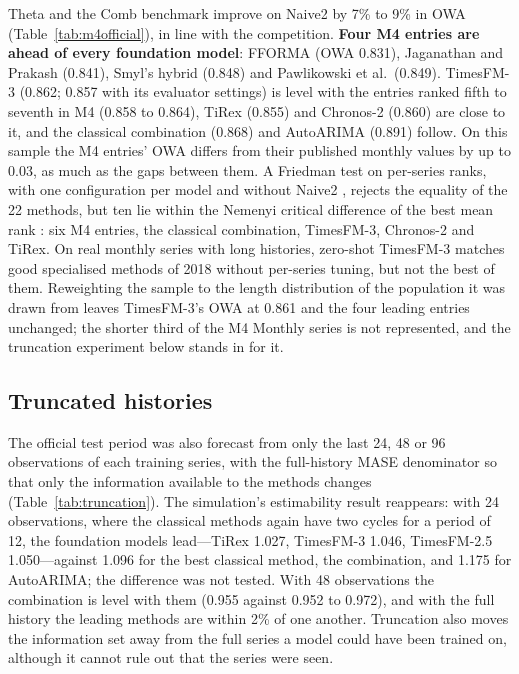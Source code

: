 \documentclass[ASNA]{USG}
\providecommand{\tableref}[1]{Table~\ref{#1}}
\begin{document}


Theta and the Comb benchmark improve on Naive2 by 7\% to 9\% in OWA (\tableref{tab:m4official}), in line
with the competition. \textbf{Four M4 entries are ahead of every foundation model}: FFORMA (OWA 0.831),
Jaganathan and Prakash (0.841), Smyl's hybrid (0.848) and Pawlikowski et al.\ (0.849). TimesFM-3 (0.862;
0.857 with its evaluator settings) is level with the entries ranked fifth to seventh in M4 (0.858 to 0.864),
TiRex (0.855) and Chronos-2 (0.860) are close to it, and the classical combination (0.868) and AutoARIMA
(0.891) follow. On this sample the M4 entries' OWA differs from their published monthly values by up to
0.03, as much as the gaps between them. A Friedman test on per-series ranks, with one configuration per model
and without Naive2 \citep{benavoli2016should}, rejects the equality of the 22 methods, but ten lie within the
Nemenyi critical difference of the best mean rank \citep{demsar2006statistical}: six M4 entries, the
classical combination, TimesFM-3, Chronos-2 and TiRex. On real monthly series with long histories, zero-shot
TimesFM-3 matches good specialised methods of 2018 without per-series tuning, but not the best of them.
Reweighting the sample to the length distribution of the population it was drawn from leaves TimesFM-3's
OWA at 0.861 and the four leading entries unchanged; the shorter third of the M4 Monthly series is not
represented, and the truncation experiment below stands in for it.

\subsection{Truncated histories}
\label{sec:truncation}

The official test period was also forecast from only the last 24, 48 or 96 observations of each training
series, with the full-history MASE denominator so that only the information available to the methods
changes (\tableref{tab:truncation}). The simulation's estimability result reappears: with 24 observations,
where the classical methods again have two cycles for a period of 12, the foundation models lead---TiRex
1.027, TimesFM-3 1.046, TimesFM-2.5 1.050---against 1.096 for the best classical method, the combination,
and 1.175 for AutoARIMA; the difference was not tested. With 48 observations the combination is level with
them (0.955 against 0.952 to 0.972), and with the full history the leading methods are within 2\% of one
another. Truncation also moves the information set away from the full series a model could have been trained
on, although it cannot rule out that the series were seen.
\end{document}
